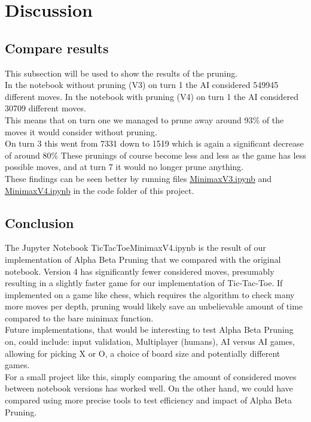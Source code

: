\section{Discussion} 
\label{sec:Discussion}

\subsection{Compare results}
This subsection will be used to show the results of the pruning.\\
In the notebook without pruning (V3) on turn 1 the AI considered 549945 different moves.
In the notebook with pruning (V4) on turn 1 the AI considered 30709 different moves.\\
This means that on turn one we managed to prune away around 93\% of the moves it would consider without pruning.\\
On turn 3 this went from 7331 down to 1519 which is again a significant decrease of around 80\%
These prunings of course become less and less as the game has less possible moves, and at turn 7 it would no longer prune anything.\\
These findings can be seen better by running files \href{code/TicTacToe_MinimaxV3.ipynb}{MinimaxV3.ipynb} 
and \href{code/TicTacToe_MinimaxV4.ipynb}{MinimaxV4.ipynb} in the code folder of this project.

\subsection{Conclusion}
The Jupyter Notebook TicTacToe\textunderscore MinimaxV4.ipynb is the result of our implementation of 
Alpha Beta Pruning that we compared with the original notebook.
Version 4 has significantly fewer considered moves, presumably resulting in a slightly faster game 
for our implementation of Tic-Tac-Toe.
If implemented on a game like chess, which requires the algorithm to check many more moves per depth, 
pruning would likely save an unbelievable amount of time compared to the bare minimax function.\\
Future implementations, that would be interesting to test Alpha Beta Pruning on, could include: input validation, Multiplayer (humans), AI versus AI games, allowing for picking X or O, 
a choice of board size and potentially different games.\\
For a small project like this, simply comparing the amount of considered moves between notebook versions has worked well.
On the other hand, we could have compared using more precise tools to test efficiency and impact of Alpha Beta Pruning.